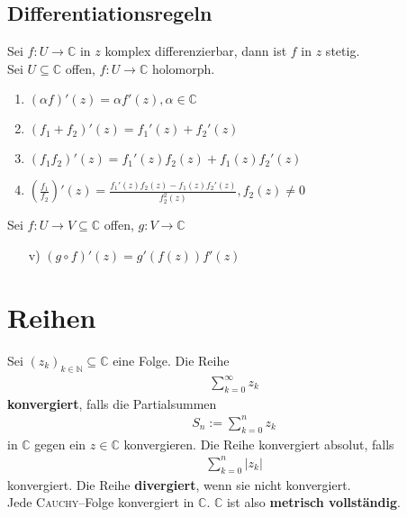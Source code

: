 \documentclass[a4paper,12pt]{article}
\numberwithin{equation}{section}
\begin{document}
\subsection{Differentiationsregeln}
Sei $f:U\rightarrow \mathbb{C}$ in $z$ komplex differenzierbar, dann ist $f$ in $z$ stetig.\\\indent
Sei $U\subseteq \mathbb{C}$ offen, $f:U\rightarrow \mathbb{C}$ holomorph.
\begin{enumerate}[label=\roman*)]
        \item $\left(\alpha f\right)'\left(z\right)=\alpha f'\left(z\right),\alpha  \in \mathbb{C}$ 
        \item $\left(f_1+f_2\right)'\left(z\right)=f_1'\left(z\right)+f_2'\left(z\right)$ 
        \item $\left(f_1f_2\right)'\left(z\right)=f_1'\left(z\right)f_2\left(z\right)+f_1\left(z\right)f_2'\left(z\right)$ 
        \item $\left(\tfrac{f_1}{f_2}\right)'\left(z\right)=\tfrac{f_1'\left(z\right)f_2\left(z\right)-f_1\left(z\right)f_2'\left(z\right)}{f_2^2\left(z\right)},f_2\left(z\right)\neq 0$ 
\end{enumerate}
Sei $f:U\rightarrow V\subseteq \mathbb{C}$ offen, $g:V\rightarrow \mathbb{C}$ 
\begin{enumerate}[label=]
        \item[v)] $\left(g\circ f\right)'\left(z\right)=g'\left(f\left(z\right)\right)f'\left(z\right)$ 
\end{enumerate}

\newpage
\section{Reihen}
Sei $\left(z_k\right)_{k \in \mathbb{N}}\subseteq \mathbb{C}$ eine Folge. Die Reihe 
\begin{align} 
        \sum_{k=0}^{\infty}z_k
\end{align} 
\textbf{konvergiert}, falls die Partialsummen
\begin{align} 
        S_n:=\sum_{k=0}^{n}z_k
\end{align} 
in $\mathbb{C}$ gegen ein $z \in \mathbb{C}$ konvergieren. Die Reihe konvergiert absolut, falls
\begin{align} 
        \sum_{k=0}^{n}|z_k|
\end{align} 
konvergiert. Die Reihe \textbf{divergiert}, wenn sie nicht konvergiert.\\\indent
Jede \textsc{Cauchy}--Folge konvergiert in $\mathbb{C}$. $\mathbb{C}$ ist also \textbf{metrisch vollständig}.
\end{document}
